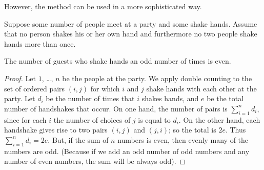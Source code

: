 However, the method can be used in a more sophisticated way.
\begin{lemma}
  Suppose some number of people meet at a party and some shake hands. Assume
  that no person shakes his or her own hand and furthermore no two people shake
  hands more than once.

  The number of guests who shake hands an odd number of times is even.
\end{lemma}
\begin{proof}
  Let $1$, \dots, $n$ be the people at the party. We apply double counting to
  the set of ordered pairs $(i, j)$ for which $i$ and $j$ shake hands with each
  other at the party. Let $d_i$ be the number of times that $i$ shakes hands,
  and $e$ be the total number of handshakes that occur. On one hand, the number
  of pairs is $\sum_{i = 1}^n d_i$, since for each $i$ the number of choices of
  $j$ is equal to $d_i$. On the other hand, each handshake gives rise to two
  pairs $(i, j)$ and $(j, i)$; so the total is $2e$.
  Thus $\sum_{i = 1}^n d_i = 2e$. But, if the sum of $n$ numbers is even, then
  evenly many of the numbers are odd.
  (Because if we add an odd number of odd numbers and any number of even
  numbers, the sum will be always odd).
\end{proof}


